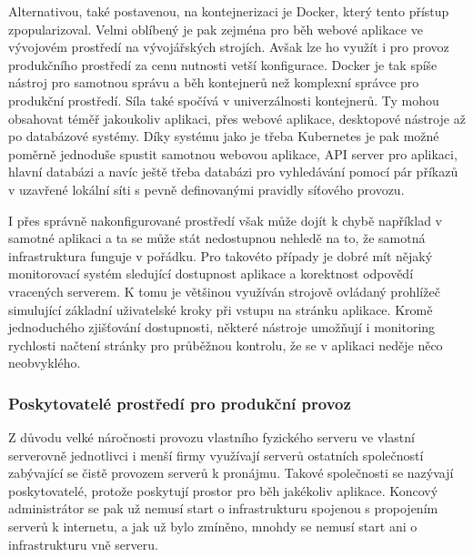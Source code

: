 		Alternativou, také postavenou, na kontejnerizaci je Docker, který tento přístup zpopularizoval.
		Velmi oblíbený je pak zejména pro běh webové aplikace ve vývojovém prostředí na vývojářských strojích.
		Avšak lze ho využít i pro provoz produkčního prostředí za cenu nutnosti vetší konfigurace.
		Docker je tak spíše nástroj pro samotnou správu a běh kontejnerů než komplexní správce pro produkční prostředí.
		Síla také spočívá v univerzálnosti kontejnerů.
		Ty mohou obsahovat téměř jakoukoliv aplikaci, přes webové aplikace, desktopové nástroje až po databázové systémy.
		Díky systému jako je třeba Kubernetes je pak možné poměrně jednoduše spustit samotnou webovou aplikace, API server pro
		aplikaci, hlavní databázi a navíc ještě třeba databázi pro vyhledávání pomocí pár příkazů v uzavřené lokální síti
		s pevně definovanými pravidly síťového provozu.


		I přes správně nakonfigurované prostředí však může dojít k chybě například v samotné aplikaci a ta se může stát nedostupnou
		nehledě na to, že samotná infrastruktura funguje v pořádku.
		Pro takovéto případy je dobré mít nějaký monitorovací systém sledující dostupnost aplikace a korektnost odpovědí
		vracených serverem.
		K tomu je většinou využíván strojově ovládaný prohlížeč simulující základní uživatelské kroky při vstupu na stránku
		aplikace.
		Kromě jednoduchého zjišťování dostupnosti, některé nástroje umožňují i monitoring rychlosti načtení stránky pro
		průběžnou kontrolu, že se v aplikaci neděje něco neobvyklého.

		\subsubsection{Poskytovatelé prostředí pro produkční provoz}

		Z důvodu velké náročnosti provozu vlastního fyzického serveru ve vlastní serverovně jednotlivci i menší firmy
		využívají serverů ostatních společností zabývající se čistě provozem serverů k pronájmu.
		Takové společnosti se nazývají poskytovatelé, protože poskytují prostor pro běh jakékoliv aplikace.
		Koncový administrátor se pak už nemusí start o infrastrukturu spojenou s propojením serverů k internetu, a jak už
		bylo zmíněno, mnohdy se nemusí start ani o infrastrukturu vně serveru.

